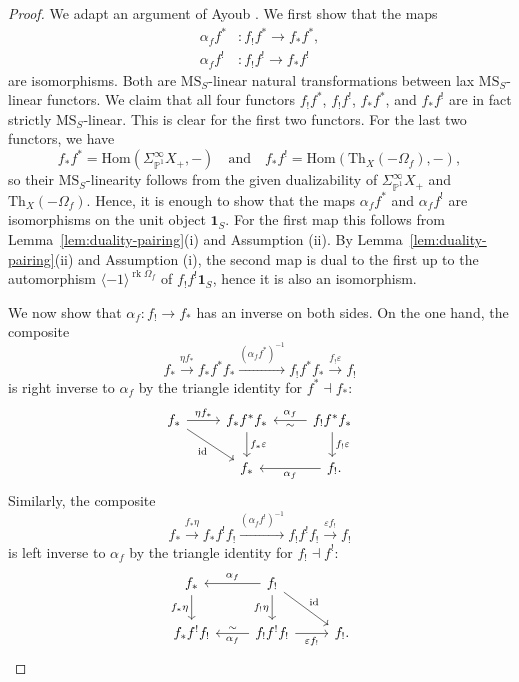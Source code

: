 \documentclass{amsart}
\numberwithin{equation}{section}
\theoremstyle{plain}
\theoremstyle{definition}
\let\bb=\mathbb
\def\P{\bb P}
\def\1{\mathbf 1}
\def\ph{\mathord-}
\def\id{\mathrm{id}}
\def\Hom{\mathrm{Hom}}
\def\Th{\mathrm{Th}}
\DeclareMathOperator{\rk}{rk}
\def\MS{\mathrm{MS}}
\let\epsilon=\varepsilon
\begin{document}
\begin{proof}
	We adapt an argument of Ayoub \cite[Proposition 1.7.16]{Ayoub}.
	We first show that the maps
		\begin{align*}
		\alpha_f f^*&\colon f_!f^* \to f_*f^*, \\
		\alpha_f f^! &\colon f_!f^! \to f_*f^!
		\end{align*}
	are isomorphisms. Both are $\MS_S$-linear natural transformations between lax $\MS_S$-linear functors. We claim that all four functors $f_!f^*$, $f_!f^!$, $f_*f^*$, and $f_*f^!$ are in fact strictly $\MS_S$-linear. This is clear for the first two functors. For the last two functors, we have
	\[
	f_*f^* = \Hom(\Sigma^\infty_{\P^1}X_+,\ph)\quad\text{and}\quad f_*f^! = \Hom(\Th_X(-\Omega_f), \ph),
	\]
	so their $\MS_S$-linearity follows from the given dualizability of $\Sigma^\infty_{\P^1}X_+$ and $\Th_X(-\Omega_f)$.
	Hence, it is enough to show that the maps $\alpha_f f^*$ and $\alpha_f f^!$ are isomorphisms on the unit object $\1_S$. For the first map this follows from Lemma~\ref{lem:duality-pairing}(i) and Assumption (ii). By Lemma~\ref{lem:duality-pairing}(ii) and Assumption (i), the second map is dual to the first up to the automorphism $\langle -1\rangle^{\rk\Omega_f}$ of $f_!f^!\1_S$, hence it is also an isomorphism.
	
	We now show that $\alpha_f\colon f_!\to f_*$ has an inverse on both sides. 
	On the one hand, the composite
	\[
	f_*\xrightarrow{\eta f_*} f_* f^*f_* \xrightarrow{(\alpha_f f^*)^{-1}} f_!f^*f_*\xrightarrow{f_!\epsilon} f_!
	\]
	is right inverse to $\alpha_f$ by the triangle identity for $f^*\dashv f_*$:
	\[
	\begin{tikzcd}
		f_* \ar{r}{\eta f_*} \ar{dr}[swap]{\id} & f_*f^*f_* \ar[<-]{r}{\alpha_f}[swap]{\sim} \ar{d}{f_*\epsilon} & f_!f^*f_* \ar{d}{f_!\epsilon} \\
		& f_* \ar[<-]{r}[swap]{\alpha_f} & f_!\rlap.
	\end{tikzcd}
	\]
	Similarly, the composite
	\[
	f_* \xrightarrow{f_*\eta} f_* f^!f_! \xrightarrow{(\alpha_f f^!)^{-1}} f_!f^!f_! \xrightarrow{\epsilon f_!} f_!
	\]
	is left inverse to $\alpha_f$ by the triangle identity for $f_!\dashv f^!$:
	\[
	\begin{tikzcd}[baseline=(LastCell.base)]
		f_* \ar[<-]{r}{\alpha_f} \ar{d}[swap]{f_*\eta} & f_! \ar{d}[swap]{f_!\eta} \ar{dr}{\id} \\
		f_* f^! f_! \ar[<-]{r}{\sim}[swap]{\alpha_f} & f_!f^!f_! \ar{r}[swap]{\epsilon f_!} & |[alias=LastCell]| f_!\rlap.
	\end{tikzcd}\qedhere
	\]
\end{proof}
\end{document}
